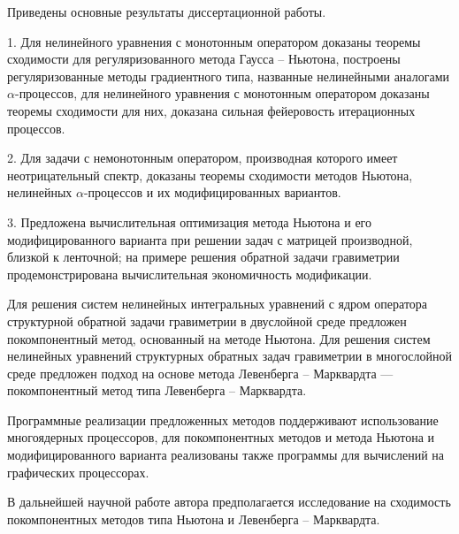 \conclusion

Приведены основные результаты диссертационной работы.

1. Для нелинейного уравнения с монотонным оператором доказаны теоремы сходимости для регуляризованного метода Гаусса -- Ньютона, построены регуляризованные методы градиентного типа, названные нелинейными аналогами $\alpha$-процессов, для нелинейного уравнения с монотонным оператором доказаны теоремы сходимости для них, доказана сильная фейеровость итерационных процессов.

2. Для задачи с немонотонным оператором, производная которого имеет неотрицательный спектр, доказаны теоремы сходимости методов Ньютона, нелинейных $\alpha$-процессов и их модифицированных вариантов.

3. Предложена вычислительная оптимизация метода Ньютона и его модифицированного варианта при решении задач с матрицей производной, близкой к ленточной; на примере решения обратной задачи гравиметрии продемонстрирована вычислительная экономичность модификации. 

Для решения систем нелинейных интегральных уравнений  с ядром оператора структурной обратной задачи гравиметрии в двуслойной среде предложен покомпонентный метод, основанный на методе Ньютона. Для решения систем нелинейных уравнений  структурных обратных задач гравиметрии в многослойной среде предложен подход на основе метода Левенберга -- Марквардта --- покомпонентный метод типа Левенберга -- Марквардта.

Программные реализации предложенных методов поддерживают использование многоядерных процессоров, для покомпонентных методов и метода Ньютона и модифицированного варианта реализованы также программы для вычислений на графических процессорах.

В дальнейшей научной работе автора предполагается исследование на сходимость покомпонентных методов типа Ньютона и Левенберга -- Марквардта.
